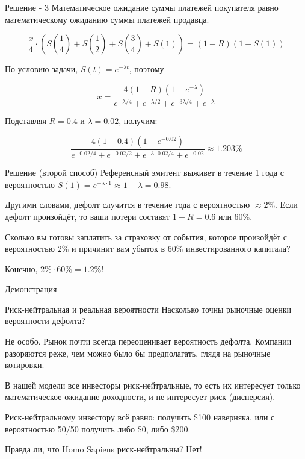 \documentclass{beamer}
\begin{document}
\begin{frame}{Решение - 3}
\justify
Математическое ожидание суммы платежей покупателя равно математическому ожиданию суммы платежей продавца.

\begin{equation*}
\frac{x}{4} \cdot \left( S\left(\frac{1}{4}\right) + S\left(\frac{1}{2}\right) + S\left(\frac{3}{4}\right) +S\left(1\right) \right) = (1 - R)(1 - S(1))
\end{equation*}

По условию задачи, $S(t)=e^{-\lambda t}$, поэтому

\begin{equation*}
x = \frac{4(1 - R)(1 - e^{-\lambda})}{e^{-\lambda / 4} + e^{-\lambda / 2} + e^{-3\lambda / 4} + e^{-\lambda}}
\end{equation*}

Подставляя $R = 0.4$ и $\lambda = 0.02$, получим:

\begin{equation*}
\frac{4(1 - 0.4)(1 - e^{-0.02})}{e^{-0.02 / 4} + e^{-0.02 / 2} + e^{-3\cdot0.02 / 4} + e^{-0.02}} \approx 1.203\%
\end{equation*}
\end{frame}



\begin{frame}{Решение (второй способ)}
\justify
Референсный эмитент выживет в течение 1 года с вероятностью $S(1) = e^{-\lambda \cdot 1} \approx 1 - \lambda = 0.98$.

\justify
Другими словами, дефолт случится в течение года с вероятностью $\approx 2\%$. Если дефолт произойдёт, то ваши потери составят $1 - R = 0.6$ или $60\%$.

\justify
Сколько вы готовы заплатить за страховку от события, которое произойдёт с вероятностью $2\%$ и причинит вам убыток в $60\%$ инвестированного капитала?

\justify
Конечно, $2\% \cdot 60\% = 1.2\%$! 
\end{frame}



\begin{frame}{Демонстрация}
\end{frame}



\begin{frame}{Риск-нейтральная и реальная вероятности}
\justify
Насколько точны рыночные оценки вероятности дефолта?

\justify
Не особо. Рынок почти всегда переоценивает вероятность дефолта. Компании разоряются реже, чем можно было бы предполагать, глядя на рыночные котировки.

\justify
В нашей модели все инвесторы \alert{риск-нейтральные}, то есть их интересует только математическое ожидание доходности, и не интересует риск (дисперсия).

\justify
Риск-нейтральному инвестору всё равно: получить \$100 наверняка, или с вероятностью 50/50 получить либо \$0, либо \$200.

\justify
Правда ли, что Homo Sapiens риск-нейтральны? Нет!
\end{frame}
\end{document}
